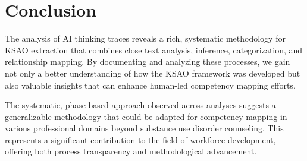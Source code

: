 \documentclass[
  letterpaper,
  DIV=11,
  numbers=noendperiod]{scrartcl}
\begin{document}
\section{Conclusion}\label{conclusion}

The analysis of AI thinking traces reveals a rich, systematic
methodology for KSAO extraction that combines close text analysis,
inference, categorization, and relationship mapping. By documenting and
analyzing these processes, we gain not only a better understanding of
how the KSAO framework was developed but also valuable insights that can
enhance human-led competency mapping efforts.

The systematic, phase-based approach observed across analyses suggests a
generalizable methodology that could be adapted for competency mapping
in various professional domains beyond substance use disorder
counseling. This represents a significant contribution to the field of
workforce development, offering both process transparency and
methodological advancement.
\end{document}
